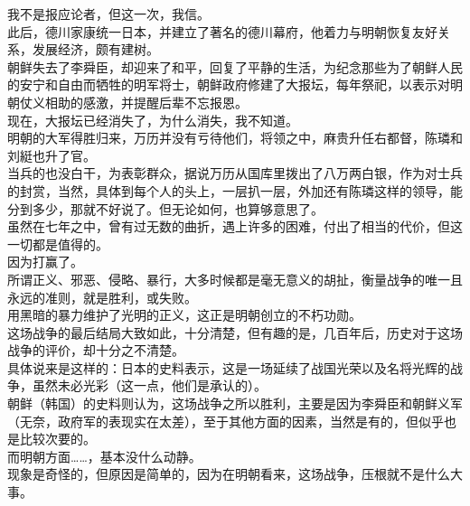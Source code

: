 \begin{multicols}{\theparacolNo}
我不是报应论者，但这一次，我信。\\

此后，德川家康统一日本，并建立了著名的德川幕府，他着力与明朝恢复友好关系，发展经济，颇有建树。\\

朝鲜失去了李舜臣，却迎来了和平，回复了平静的生活，为纪念那些为了朝鲜人民的安宁和自由而牺牲的明军将士，朝鲜政府修建了大报坛，每年祭祀，以表示对明朝仗义相助的感激，并提醒后辈不忘报恩。\\

现在，大报坛已经消失了，为什么消失，我不知道。\\

明朝的大军得胜归来，万历并没有亏待他们，将领之中，麻贵升任右都督，陈璘和刘綎也升了官。\\

当兵的也没白干，为表彰群众，据说万历从国库里拨出了八万两白银，作为对士兵的封赏，当然，具体到每个人的头上，一层扒一层，外加还有陈璘这样的领导，能分到多少，那就不好说了。但无论如何，也算够意思了。\\

虽然在七年之中，曾有过无数的曲折，遇上许多的困难，付出了相当的代价，但这一切都是值得的。\\

因为打赢了。\\

所谓正义、邪恶、侵略、暴行，大多时候都是毫无意义的胡扯，衡量战争的唯一且永远的准则，就是胜利，或失败。\\

用黑暗的暴力维护了光明的正义，这正是明朝创立的不朽功勋。\\

这场战争的最后结局大致如此，十分清楚，但有趣的是，几百年后，历史对于这场战争的评价，却十分之不清楚。\\

具体说来是这样的：日本的史料表示，这是一场延续了战国光荣以及名将光辉的战争，虽然未必光彩（这一点，他们是承认的）。\\

朝鲜（韩国）的史料则认为，这场战争之所以胜利，主要是因为李舜臣和朝鲜义军（无奈，政府军的表现实在太差），至于其他方面的因素，当然是有的，但似乎也是比较次要的。\\

而明朝方面……，基本没什么动静。\\

现象是奇怪的，但原因是简单的，因为在明朝看来，这场战争，压根就不是什么大事。\\


\end{multicols}
